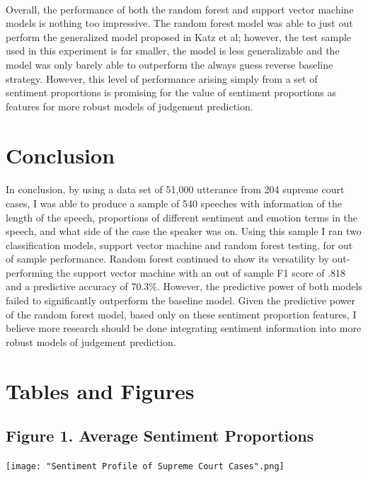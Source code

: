 \documentclass[12pt,english]{article}
\begin{document}
\paragraph{}
Overall, the performance of both the random forest and support vector machine models is nothing too impressive. The random forest model was able to just out perform the generalized model proposed in Katz et al; however, the test sample used in this experiment is far smaller, the model is less generalizable and the model was only barely able to outperform the always guess reverse baseline strategy. However, this level of performance arising simply from a set of sentiment proportions is promising for the value of sentiment proportions as features for more robust models of judgement prediction.
\section{Conclusion}
\paragraph{}
In conclusion, by using a data set of 51,000 utterance from 204 supreme court cases, I was able to produce a sample of 540 speeches with information of the length of the speech, proportions of different sentiment and emotion terms in the speech, and what side of the case the speaker was on. Using this sample I ran two classification models, support vector machine and random forest testing, for out of sample performance. Random forest continued to show its versatility by out-performing the support vector machine with an out of sample F1 score of .818 and a predictive accuracy of 70.3\%. However, the predictive power of both models failed to significantly outperform the baseline model. Given the predictive power of the random forest model, based only on these sentiment proportion features, I believe more research should be done integrating sentiment information into more robust models of judgement prediction.   
\pagebreak{}



\pagebreak{}
\section{Tables and Figures}
\subsection{Figure 1. Average Sentiment Proportions}
\begin{center}
\texttt{[image: "Sentiment Profile of Supreme Court
Cases".png]}
\end{center}
\end{document}
